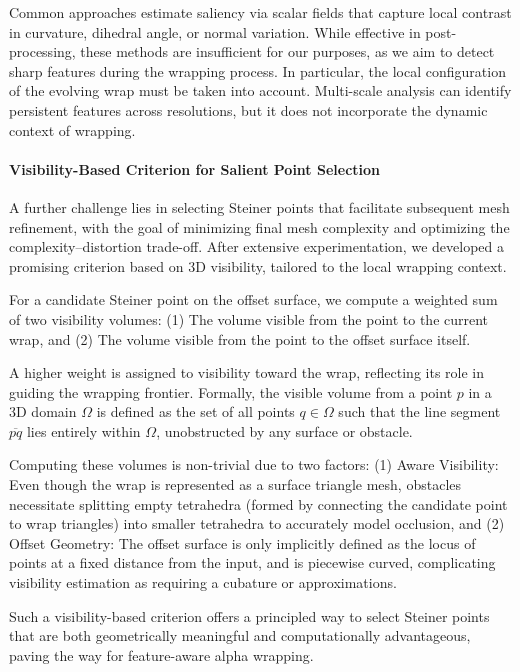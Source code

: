 Common approaches estimate saliency via scalar fields that capture local contrast in curvature, dihedral angle, or normal variation. While effective in post-processing, these methods are insufficient for our purposes, as we aim to detect sharp features during the wrapping process. In particular, the local configuration of the evolving wrap must be taken into account. Multi-scale analysis can identify persistent features across resolutions, but it does not incorporate the dynamic context of wrapping.

\paragraph{Visibility-Based Criterion for Salient Point Selection}

A further challenge lies in selecting Steiner points that facilitate subsequent mesh refinement, with the goal of minimizing final mesh complexity and optimizing the complexity–distortion trade-off. After extensive experimentation, we developed a promising criterion based on 3D visibility, tailored to the local wrapping context.

For a candidate Steiner point on the offset surface, we compute a weighted sum of two visibility volumes: (1) The volume visible from the point to the current wrap, and (2) The volume visible from the point to the offset surface itself.


A higher weight is assigned to visibility toward the wrap, reflecting its role in guiding the wrapping frontier. Formally, the visible volume from a point $p$ in a 3D domain $\Omega$ is defined as the set of all points $q \in \Omega$ such that the line segment $\overline{pq}$ lies entirely within $\Omega$, unobstructed by any surface or obstacle.

Computing these volumes is non-trivial due to two factors: (1) Aware Visibility: Even though the wrap is represented as a surface triangle mesh, obstacles necessitate splitting empty tetrahedra (formed by connecting the candidate point to wrap triangles) into smaller tetrahedra to accurately model occlusion, and (2) Offset Geometry: The offset surface is only implicitly defined as the locus of points at a fixed distance from the input, and is piecewise curved, complicating visibility estimation as requiring a cubature or approximations.

Such a visibility-based criterion offers a principled way to select Steiner points that are both geometrically meaningful and computationally advantageous, paving the way for feature-aware alpha wrapping.


